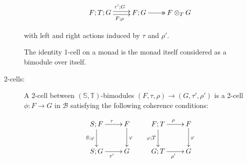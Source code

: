 \begin{definition}
\begin{description}
$$
\xymatrix{
F;T;G  \ar@<-.5ex>[r]_{F;\rho} \ar@<.5ex>[r]^{\tau';G} & F;G \ar@{->>}[r] &F \otimes_T G 
}
$$
%
%

with left and right actions induced by $\tau$ and $\rho'$.

The identity 1-cell on a monad is the monad itself considered as a bimodule over itself.

\item[2-cells:] A 2-cell between $(\mathbb{S},\mathbb{T})$-bimodules $(F,\tau,\rho)\to (G,\tau',\rho')$ is a 2-cell $\phi:F\to G$ in $\mathcal{B}$ satisfying the following coherence conditions:

$$
\xymatrix{
  S;F \ar[r]^{\tau}  \ar[d]_{S;\phi}
   & F \ar[d]^{\phi}
\\S;G \ar[r]_{\tau'}
   &G
}
\hspace*{.5cm}
\xymatrix{
  F;T \ar[r]^{\rho}  \ar[d]_{\phi;T}
   & F \ar[d]^{\phi}
\\G;T \ar[r]_{\rho'}
   &G
}
$$


\end{description}
\end{definition}
